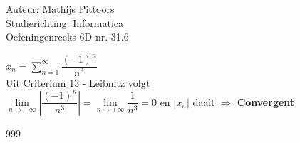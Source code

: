 \documentclass[a4paper]{article}
\newcommand{\llim}{\lim\limits}
\begin{document}
  
\noindent \large Auteur: Mathijs Pittoors \\
\noindent \large Studierichting: Informatica\\
\noindent \large Oefeningenreeks 6D nr. 31.6\\

\medskip

\normalsize

$x_n = \displaystyle\sum_{n=1}^\infty \dfrac{(-1)^n}{n^3}$\\

Uit Criterium 13 - Leibnitz volgt\\

$\llim_{n\rightarrow+\infty} \left|\dfrac{(-1)^n}{n^3}\right|=\llim_{n\rightarrow+\infty} \dfrac{1}{n^3} = 0$ en $|x_n|$ daalt $\Rightarrow$ \textbf{Convergent}


\begin{thebibliography}{999}
\end{thebibliography}
\end{document}
